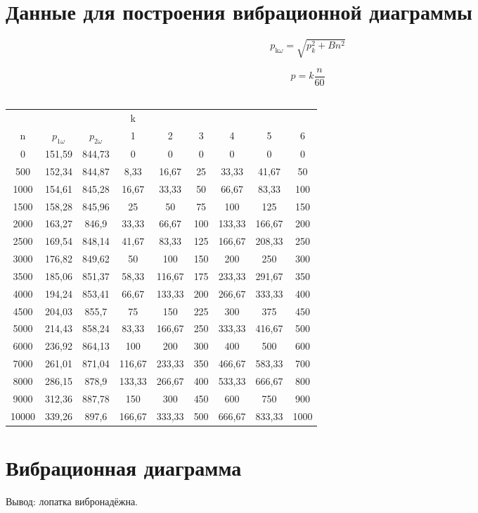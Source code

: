 \section{Данные для построения вибрационной диаграммы}

\[p_{\text{k}\omega} = \sqrt{p_{k}^{2} + Bn^{2}}\]

\[p = k\frac{n}{60}\]\\

\begin{longtable}{ccccccccc}
& & & k & & & & &\\
n & \(p_{1\omega}\) & \(p_{2\omega}\) & 1 & 2 & 3 & 4 & 5 & 6\\
0 & 151,59 & 844,73 & 0 & 0 & 0 & 0 & 0 & 0\\
500 & 152,34 & 844,87 & 8,33 & 16,67 & 25 & 33,33 & 41,67 & 50\\
1000 & 154,61 & 845,28 & 16,67 & 33,33 & 50 & 66,67 & 83,33 & 100\\
1500 & 158,28 & 845,96 & 25 & 50 & 75 & 100 & 125 & 150\\
2000 & 163,27 & 846,9 & 33,33 & 66,67 & 100 & 133,33 & 166,67 & 200\\
2500 & 169,54 & 848,14 & 41,67 & 83,33 & 125 & 166,67 & 208,33 & 250\\
3000 & 176,82 & 849,62 & 50 & 100 & 150 & 200 & 250 & 300\\
3500 & 185,06 & 851,37 & 58,33 & 116,67 & 175 & 233,33 & 291,67 & 350\\
4000 & 194,24 & 853,41 & 66,67 & 133,33 & 200 & 266,67 & 333,33 & 400\\
4500 & 204,03 & 855,7 & 75 & 150 & 225 & 300 & 375 & 450\\
5000 & 214,43 & 858,24 & 83,33 & 166,67 & 250 & 333,33 & 416,67 & 500\\
6000 & 236,92 & 864,13 & 100 & 200 & 300 & 400 & 500 & 600\\
7000 & 261,01 & 871,04 & 116,67 & 233,33 & 350 & 466,67 & 583,33 & 700\\
8000 & 286,15 & 878,9 & 133,33 & 266,67 & 400 & 533,33 & 666,67 &800\\
9000 & 312,36 & 887,78 & 150 & 300 & 450 & 600 & 750 & 900\\
10000 & 339,26 & 897,6 & 166,67 & 333,33 & 500 & 666,67 & 833,33 & 1000\\
\end{longtable}

\section{Вибрационная диаграмма}

Вывод: лопатка вибронадёжна.


